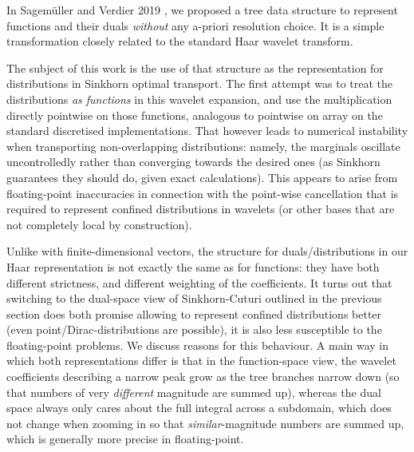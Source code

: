 \documentclass[a4paper]{easychair}
\begin{document}
In Sagemüller and Verdier 2019 \cite{SagVerdier-LazyWavelet}, we proposed a tree data structure to represent functions and their duals \emph{without} any a-priori resolution choice. It is a simple transformation closely related to the standard Haar wavelet transform.

The subject of this work is the use of that structure as the representation for distributions in Sinkhorn optimal transport. The first attempt was to treat the distributions \emph{as functions} in this wavelet expansion, and use the multiplication directly pointwise on those functions, analogous to pointwise on array on the standard discretised implementations.
That however leads to numerical instability when transporting non-overlapping distributions: namely, the marginals oscillate uncontrolledly rather than converging towards the desired ones (as Sinkhorn guarantees they should do, given exact calculations). This appears to arise from floating-point inaccuracies in connection with the point-wise cancellation that is required to represent confined distributions in wavelets (or other bases that are not completely local by construction).

Unlike with finite-dimensional vectors, the structure for duals/distributions in our Haar representation is not exactly the same as for functions: they have both different strictness, and different weighting of the coefficients.
It turns out that switching to the dual-space view of Sinkhorn-Cuturi outlined in the previous section does both promise allowing to represent confined distributions better (even point/Dirac-distributions are possible), it is also less susceptible to the floating-point problems. We discuss reasons for this behaviour.
A main way in which both representations differ is that in the function-space view, the wavelet coefficients describing a narrow peak grow as the tree branches narrow down (so that numbers of very \emph{different} magnitude are summed up), whereas the dual space always only cares about the full integral across a subdomain, which does not change when zooming in so that \emph{similar}-magnitude numbers are summed up, which is generally more precise in floating-point.



%
%

%
%
%



\end{document}
